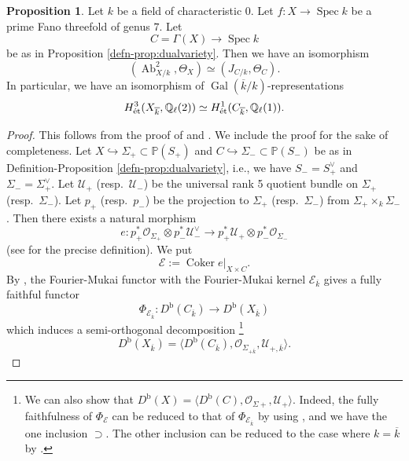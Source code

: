 \documentclass[autodetect-engine, a4paper]{amsart}
\theoremstyle{definition}
\newtheorem{prop}[thm]{Proposition}
\def\P{{\mathbb P}}
\def\Q{{\mathbb Q}}
\def\cO{\mathcal{O}}
\DeclareMathOperator\Ab{\mathrm{Ab}}
\DeclareMathOperator{\coker}{Coker}
\DeclareMathOperator\Gal{\mathrm{Gal}}
\DeclareMathOperator\Spec{\mathrm{Spec}}
\def\et{\mathop{\text{\rm \'et}}}
\begin{document}
\begin{prop}
\label{prop:dualcompatiblejacobian}
Let $k$ be a field of characteristic $0$.
Let $f \colon X \rightarrow \Spec k$ be a prime Fano threefold of genus $7$.
Let \[
 C = \Gamma (X) \rightarrow \Spec k
\]
be as in Proposition \ref{defn-prop:dualvariety}.
Then we have an isomorphism
\[
(\Ab_{X/k}^2, \Theta_{X}) \simeq (J_{C/k},\Theta_{C}).
\]
In particular, we have an isomorphism of $\Gal(\overline{k}/k)$-representations
\[
H^3_{\et} (X_{\overline{k}}, \Q_{\ell} (2)) \simeq H^1_{\et} (C_{\overline{k}}, \Q_{\ell} (1)).
\]
\end{prop}
\begin{proof}
This follows from the proof of \cite[Proposition 8.4]{KuznetsovProkhorov} and \cite[Subsection 6.2]{Kuznetsovhyperplane}.
We include the proof for the sake of completeness.
Let $X \hookrightarrow \Sigma_{+} \subset\P(S_{+})$ and $C \hookrightarrow \Sigma_{-} \subset \P(S_{-})$ be as in Definition-Proposition \ref{defn-prop:dualvariety}, i.e., we have $S_{-} = S_{+}^{\vee}$ and $\Sigma_{-} = \Sigma_{+}^{\vee}$.
Let $\mathcal{U}_{+}$ (resp.\ $\mathcal{U}_-$) be the universal rank 5 quotient bundle on $\Sigma_{+}$ (resp.\ $\Sigma_{-}$).
Let $p_{+}$ (resp.\ $p_-$) be the projection to $\Sigma_+$ (resp.\ $\Sigma_-$) from $\Sigma_{+} \times_{k} \Sigma_{-}$. 
Then there exists a natural morphism 
\[
e \colon p_+^* \cO_{\Sigma_+} \otimes p_-^* \mathcal{U}_-^{\vee} 
\rightarrow 
p_+^* \mathcal{U}_+ 
\otimes p_-^* \cO_{\Sigma_{-}}
\]
(see \cite[\S1 and Subsectino 6.2]{Kuznetsovhyperplane} for the precise definition).
We put
\[
\mathcal{E} := \coker e |_{X \times C}.
\]
By \cite[Theorem 2.46 and Theorem 4.19]{Kuznetsovhyperplane}, the Fourier-Mukai functor with the Fourier-Mukai kernel $\mathcal{E}_{\overline{k}}$ gives a fully faithful functor 
\[
\Phi_{\mathcal{E}_{\overline{k}}} \colon D^{\mathrm{b}} (C_{\overline{k}}) \rightarrow D^{\mathrm{b}} (X_{\overline{k}})
\]
which induces a semi-orthogonal decomposition \footnote{We can also show that $D^{\mathrm{b}} (X) = \langle D^{\mathrm{b}} (C), \cO_{\Sigma+}, \mathcal{U}_+ \rangle$. Indeed, the fully faithfulness of $\Phi_{\mathcal{E}}$ can be reduced to that of $\Phi_{\mathcal{E}_{\overline{k}}}$ by using \cite[Proposition 1.49 and Proposition 3.17]{Huybrechts}, and we have the one inclusion $\supset$. The other inclusion can be reduced to the case where $k=\overline{k}$ by \cite[Lemma 1.61]{Huybrechts}.}
\[
D^{\mathrm{b}} (X_{\overline{k}}) =
\langle
D^{\mathrm{b}} (C_{\overline{k}}), \cO_{\Sigma_{+ \overline{k}}}, \mathcal{U}_{+, \overline{k}} 
\rangle.
\]


\end{proof}
\end{document}
